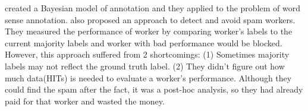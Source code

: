 \documentclass[11pt,letterpaper]{article}
\begin{document}
 created a Bayesian model of annotation and they applied to the problem of word sense annotation.  also proposed an approach to detect and avoid spam workers. 
They measured the performance of worker by comparing worker's labels to the current majority labels and worker with bad performance would be blocked. However, this approach suffered from 2 shortcomings: (1) Sometimes majority labels may not reflect the ground truth label. (2) They didn't figure out  how much data(HITs) is needed to evaluate a worker's performance. Although they could find the spam after the fact, it was a post-hoc analysis, so they had already paid for that worker and wasted the money.
\end{document}
